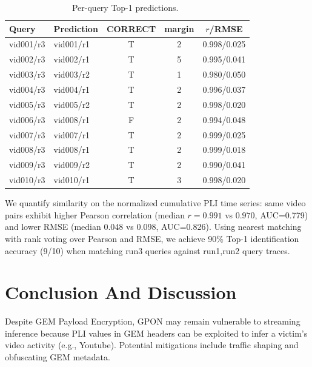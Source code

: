 \documentclass[conference]{IEEEtran}
\begin{document}
\begin{table}[H]
  \centering
  \tiny
  \setlength{\tabcolsep}{1pt}
  \renewcommand{\arraystretch}{0.3}
  \caption{Per-query Top-1 predictions.~\cite{github}}
  \label{tab:top1-detail}
  \begin{tabular}{l l c c c}
    \hline
    \textbf{Query} & \textbf{Prediction} & \textbf{CORRECT} & \textbf{margin} & \textbf{$r$/RMSE} \\
    \hline
    vid001/r3 & vid001/r1 & T & 2 & 0.998/0.025 \\
    vid002/r3 & vid002/r1 & T & 5 & 0.995/0.041 \\
    vid003/r3 & vid003/r2 & T & 1 & 0.980/0.050 \\
    vid004/r3 & vid004/r1 & T & 2 & 0.996/0.037 \\
    vid005/r3 & vid005/r2 & T & 2 & 0.998/0.020 \\
    vid006/r3 & vid008/r1 & F & 2 & 0.994/0.048 \\
    vid007/r3 & vid007/r1 & T & 2 & 0.999/0.025 \\
    vid008/r3 & vid008/r1 & T & 2 & 0.999/0.018 \\
    vid009/r3 & vid009/r2 & T & 2 & 0.990/0.041 \\
    vid010/r3 & vid010/r1 & T & 3 & 0.998/0.020 \\
    \hline
  \end{tabular}
\end{table}
\vspace{-0.9em}
We quantify similarity on the normalized cumulative PLI time series: same video pairs exhibit higher Pearson correlation (median $r=0.991$ vs $0.970$, AUC=0.779) and lower RMSE (median 0.048 vs 0.098, AUC=0.826).
Using nearest matching with rank voting over Pearson and RMSE, we achieve 90\% Top-1 identification accuracy (9/10) when matching run3 queries against run1,run2 query traces.

\section{Conclusion And Discussion}
Despite GEM Payload Encryption, GPON may remain vulnerable to streaming inference because PLI values in GEM headers can be exploited to infer a victim’s video activity (e.g., Youtube). 
Potential mitigations include traffic shaping and obfuscating GEM metadata.
\end{document}
